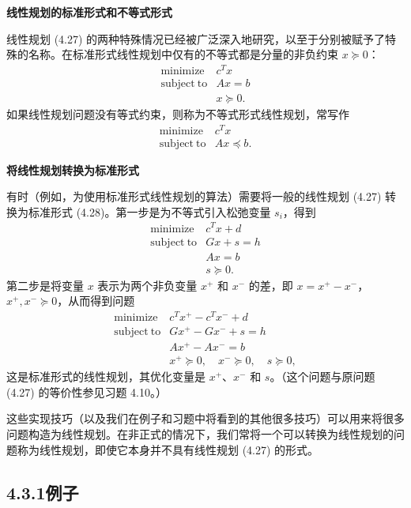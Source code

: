 \documentclass[UTF8, 12pt, fontset=fandol, oneside]{ctexart}
\begin{document}
\noindent\textbf{线性规划的标准形式和不等式形式}

线性规划 (4.27) 的两种特殊情况已经被广泛深入地研究，以至于分别被赋予了特殊的名称。在标准形式线性规划中仅有的不等式都是分量的非负约束 $x\succeq 0$：
\begin{equation}
\begin{array}{ll}
\mathop{\mathrm{minimize}} & c^Tx\\
\mathrm{subject\ to} & Ax=b\\
& x\succeq 0.
\end{array}
\tag{4.28}
\end{equation}
如果线性规划问题没有等式约束，则称为不等式形式线性规划，常写作
\begin{equation}
\begin{array}{ll}
\mathop{\mathrm{minimize}} & c^Tx\\
\mathrm{subject\ to} & Ax\preceq b.
\end{array}
\tag{4.29}
\end{equation}

\noindent\textbf{将线性规划转换为标准形式}

有时（例如，为使用标准形式线性规划的算法）需要将一般的线性规划 (4.27) 转换为标准形式 (4.28)。第一步是为不等式引入松弛变量 $s_i$，得到
\[
\begin{array}{ll}
\mathop{\mathrm{minimize}} & c^Tx+d\\
\mathrm{subject\ to} & Gx+s=h\\
& Ax=b\\
& s\succeq 0.
\end{array}
\]
第二步是将变量 $x$ 表示为两个非负变量 $x^+$ 和 $x^-$ 的差，即 $x=x^+-x^-$，$x^+,x^-\succeq 0$，从而得到问题
\[
\begin{array}{ll}
\mathop{\mathrm{minimize}} & c^Tx^+-c^Tx^-+d\\
\mathrm{subject\ to} & Gx^+-Gx^-+s=h\\
& Ax^+-Ax^-=b\\
& x^+\succeq 0,\quad x^-\succeq 0,\quad s\succeq 0,
\end{array}
\]
这是标准形式的线性规划，其优化变量是 $x^+$、$x^-$ 和 $s$。（这个问题与原问题 (4.27) 的等价性参见习题 4.10。）

这些实现技巧（以及我们在例子和习题中将看到的其他很多技巧）可以用来将很多问题构造为线性规划。在非正式的情况下，我们常将一个可以转换为线性规划的问题称为线性规划，即使它本身并不具有线性规划 (4.27) 的形式。

\subsection*{4.3.1\quad 例子}
\end{document}
